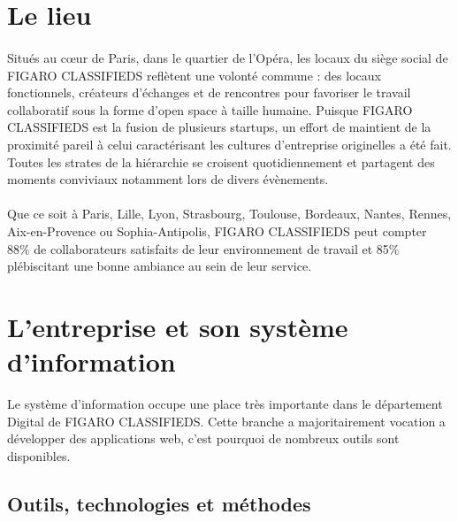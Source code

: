 \section{Le lieu}
\paragraph{}
Situés au cœur de Paris, dans le quartier de l’Opéra, les locaux du siège social de FIGARO CLASSIFIEDS reflètent une volonté commune : des locaux fonctionnels, créateurs d’échanges et de rencontres pour favoriser le travail collaboratif sous la forme d'open space à taille humaine.
Puisque FIGARO CLASSIFIEDS est la fusion de plusieurs startups, un effort de maintient de la proximité pareil à celui caractérisant les cultures d'entreprise originelles a été fait.
Toutes les strates de la hiérarchie se croisent quotidiennement et partagent des moments conviviaux notamment lors de divers évènements.
\paragraph{}
Que ce soit à Paris, Lille, Lyon, Strasbourg, Toulouse, Bordeaux, Nantes, Rennes, Aix-en-Provence ou Sophia-Antipolis, FIGARO CLASSIFIEDS peut compter 88\% de collaborateurs satisfaits de leur environnement de travail et 85\% plébiscitant une bonne ambiance au sein de leur service.

\section{L'entreprise et son système d'information}
Le système d'information occupe une place très importante dans le département Digital de FIGARO CLASSIFIEDS.
Cette branche a majoritairement vocation a développer des applications web, c'est pourquoi de nombreux outils sont disponibles.

\subsection{Outils, technologies et méthodes}
\label{subs:Outils, technologies et methodes}
